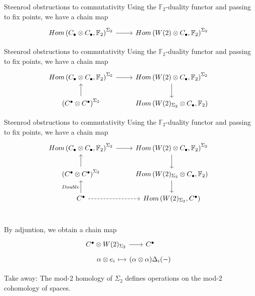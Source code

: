 \documentclass[10pt,t]{beamer}
\newcommand{\F}{\mathbb F}
\begin{document}
\begin{frame}[fragile]{Steenrod obstructions to commutativity}
	Using the $\F_2$-duality functor and passing to fix points, we have a chain map 
	\begin{equation*}
	\begin{tikzcd}
	Hom\left(C_\bullet \otimes C_\bullet, \F_2 \right)^{\Sigma_2} \arrow[r] &
	Hom\left(W(2) \otimes C_\bullet, \F_2 \right)^{\Sigma_2}
	\end{tikzcd}
	\end{equation*}
\end{frame}
\begin{frame}[fragile]{Steenrod obstructions to commutativity}
	Using the $\F_2$-duality functor and passing to fix points, we have a chain map 
	\begin{equation*}
	\begin{tikzcd}
	Hom\left(C_\bullet \otimes C_\bullet, \F_2 \right)^{\Sigma_2} \arrow[r] &
	Hom\left(W(2) \otimes C_\bullet, \F_2 \right)^{\Sigma_2} \arrow[d] \\
	\left(C^\bullet \otimes C^\bullet\right)^{\Sigma_2} \arrow[u] &
	Hom\left(W(2)_{\Sigma_2} \otimes C_\bullet, \F_2 \right)
	\end{tikzcd}
	\end{equation*}
\end{frame}
\begin{frame}[fragile]{Steenrod obstructions to commutativity}
	Using the $\F_2$-duality functor and passing to fix points, we have a chain map 
	\begin{equation*}
	\begin{tikzcd}
	Hom\left(C_\bullet \otimes C_\bullet, \F_2 \right)^{\Sigma_2} \arrow[r] &
	Hom\left(W(2) \otimes C_\bullet, \F_2 \right)^{\Sigma_2} \arrow[d] \\
	\left(C^\bullet \otimes C^\bullet\right)^{\Sigma_2} \arrow[u]&
	Hom\left(W(2)_{\Sigma_2} \otimes C_\bullet, \F_2 \right) \arrow[d] \\
	C^\bullet \arrow[u, "Double"] \arrow[r, dashed]&
	Hom\left(W(2)_{\Sigma_2}, C^\bullet\right) \\
	\end{tikzcd}
	\end{equation*}
	
	\vspace*{-20pt}\pause
	
	By adjuntion, we obtain a chain map
	\vspace*{-2pt}
	\begin{equation*}
	\begin{tikzcd}[row sep=tiny, column sep = tiny]
	C^\bullet \otimes W(2)_{\Sigma_2} \arrow[r] &[-10pt] C^\bullet \\
	\alpha \otimes e_i \arrow[r, |->] & (\alpha \otimes \alpha)\Delta_i(-)
	\end{tikzcd}
	\end{equation*}
	
	\vspace*{-5pt}\pause
	
	\textcolor{pblue}{Take away:} The mod-2 homology of $\Sigma_2$ defines operations on the mod-2 cohomology of spaces.
\end{frame}
\end{document}
